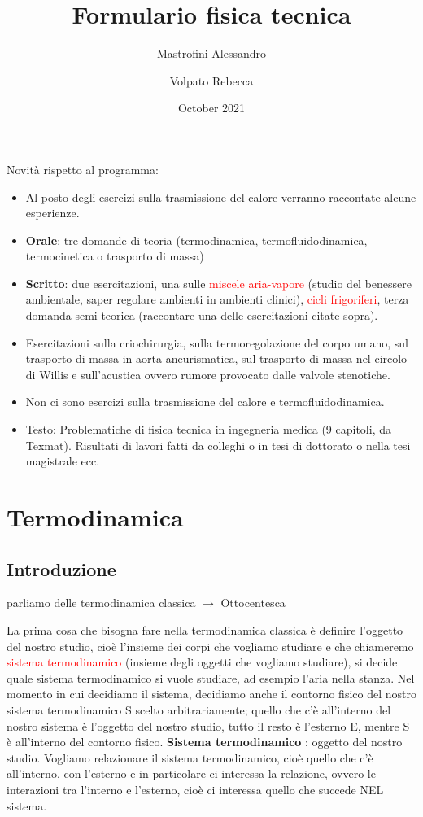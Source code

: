 \documentclass[a4paper]{article}
\title{Formulario fisica tecnica}
\author{
	Mastrofini Alessandro\\
	\and
	Volpato Rebecca\\
}
\date{October 2021}
\numberwithin{equation}{section}%
\begin{document}
\newpage
\maketitle
\newpage
\tableofcontents
\newpage	

\newpage 

Novità rispetto al programma:
\begin{itemize}
	\item Al posto degli esercizi sulla trasmissione del calore verranno raccontate alcune esperienze.
	\item 	\textbf{Orale}: tre domande di teoria (termodinamica, termofluidodinamica, termocinetica o trasporto di massa) 
	\item \textbf{Scritto}: due esercitazioni, una sulle \textcolor{red}{miscele aria-vapore }(studio del benessere ambientale, saper regolare ambienti in ambienti clinici), \textcolor{red}{cicli frigoriferi}, terza domanda semi teorica (raccontare una delle esercitazioni citate sopra). 
	\item Esercitazioni sulla criochirurgia, sulla termoregolazione del corpo umano, sul trasporto di massa in aorta aneurismatica, sul trasporto di massa nel circolo di Willis e sull’acustica ovvero rumore provocato dalle valvole stenotiche. 
	\item Non ci sono esercizi sulla trasmissione del calore e termofluidodinamica.
	\item Testo: Problematiche di fisica tecnica in ingegneria medica (9 capitoli, da Texmat). Risultati di lavori fatti da colleghi o in tesi di dottorato o nella tesi magistrale ecc.
	
\end{itemize}


\newpage 


\section{Termodinamica}
\subsection{Introduzione}
	
parliamo delle termodinamica classica $\rightarrow$ Ottocentesca


La prima cosa che bisogna fare nella termodinamica classica è definire l’oggetto del nostro studio, cioè l’insieme dei corpi che vogliamo studiare e che chiameremo \textcolor{red}{sistema termodinamico} (insieme degli oggetti che vogliamo studiare), si decide quale sistema termodinamico si vuole studiare, ad esempio l’aria nella stanza.
Nel momento in cui decidiamo il sistema, decidiamo anche il contorno fisico del nostro sistema termodinamico S scelto arbitrariamente; quello che c’è all’interno del nostro sistema è l’oggetto del nostro studio, tutto il resto è l’esterno E, mentre S è all’interno del contorno fisico.
\textbf{Sistema termodinamico} : oggetto del nostro studio.
Vogliamo relazionare il sistema termodinamico, cioè quello che c’è all’interno, con l’esterno e in particolare ci interessa la relazione, ovvero le interazioni tra l’interno e l’esterno, cioè ci interessa quello che succede NEL sistema.
\end{document}
